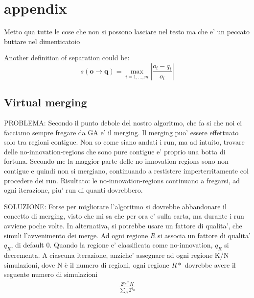 \section{appendix}
Metto qua tutte le cose che non si possono lasciare nel testo ma che e' un peccato buttare nel dimenticatoio

\begin{definition} Another definition of separation could be:
	\[
	s\left(\mathbf{o}\rightarrow\mathbf{q}\right)=\max_{i=1,\dots,m}\left|\frac{o_{i}-q_{i}}{o_{i}}\right|
	\]
\end{definition}

\subsection{Virtual merging}
PROBLEMA: Secondo il punto debole del nostro algoritmo, che fa si che noi ci facciamo sempre fregare da GA e' il merging. Il merging puo' essere effettuato solo tra regioni contigue. Non so come siano andati i run, ma ad intuito, trovare delle no-innovation-regions che sono pure contigue e' proprio una botta di fortuna. Secondo me la maggior parte delle no-innovation-regions sono non contigue e quindi non si mergiano, continuando a restistere imperterritamente col procedere dei run. Risultato: le no-innovation-regions continuano a fregarsi, ad ogni iterazione, piu' run di quanti dovrebbero.

SOLUZIONE: Forse per migliorare l'algoritmo si dovrebbe abbandonare il concetto di merging, visto che mi sa che per ora e' sulla carta, ma durante i run avviene poche volte. In alternativa, si potrebbe usare un fattore di qualita', che simuli l'avvenimento dei merge. Ad ogni regione $R$ si associa un fattore di qualita' $q_R$, di default 0. Quando la regione e' classificata come no-innovation, $q_R$ si decrementa. A ciascuna iterazione, anziche' assegnare ad ogni regione K/N simulazioni, dove N è il numero di regioni, ogni regione $R*$ dovrebbe avere il seguente numero di simulazioni
	\begin{align}
    \frac{2^{q_R*} K} { \sum_R  2^{q_R} }
	\end{align}

